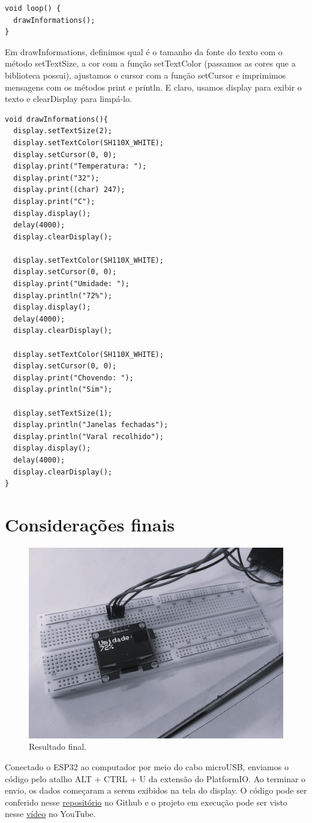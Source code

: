 \documentclass[12pt]{article}
\begin{document}
\begin{lstlisting}
void loop() {
  drawInformations();
}
\end{lstlisting}

Em drawInformations, definimos qual é o tamanho da fonte do texto com o método setTextSize, a cor com a função setTextColor (passamos as cores que a biblioteca possui), ajustamos o cursor com a função setCursor e imprimimos mensagens com os métodos print e println. E claro, usamos display para exibir o texto e clearDisplay para limpá-lo.

\begin{lstlisting}
void drawInformations(){
  display.setTextSize(2);
  display.setTextColor(SH110X_WHITE);
  display.setCursor(0, 0);
  display.print("Temperatura: ");
  display.print("32");
  display.print((char) 247);
  display.print("C");
  display.display();
  delay(4000);
  display.clearDisplay();

  display.setTextColor(SH110X_WHITE);
  display.setCursor(0, 0);
  display.print("Umidade: ");
  display.println("72%");
  display.display();
  delay(4000);
  display.clearDisplay();

  display.setTextColor(SH110X_WHITE);
  display.setCursor(0, 0);
  display.print("Chovendo: ");
  display.println("Sim");

  display.setTextSize(1);
  display.println("Janelas fechadas");
  display.println("Varal recolhido");
  display.display();
  delay(4000);
  display.clearDisplay();
}
\end{lstlisting}

\section{Considerações finais}

\begin{figure}[H]
    \centering
    \includegraphics[width=0.5\linewidth]{img/protoboard.jpg}
    \caption{Resultado final.}
    \label{fig:protoboard}
\end{figure}

Conectado o ESP32 ao computador por meio do cabo microUSB, enviamos o código pelo atalho ALT + CTRL + U da extensão do PlatformIO. Ao terminar o envio, os dados começaram a serem exibidos na tela do display. O código pode ser conferido nesse \href{https://github.com/fabricio-araujo94/microcontroladores/tree/main/display}{repositório} no Github e o projeto em execução pode ser visto nesse \href{https://youtu.be/i_BG1nU16ck}{vídeo} no YouTube.
\end{document}
